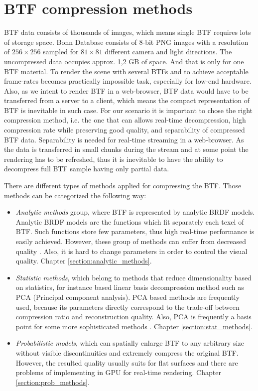 \chapter{BTF compression methods}
\label{chapter:compression_methods}



 BTF data consists of thousands of images, which means single BTF requires lots of storage space.
Bonn  Database \cite{btfBonn} consists of 8-bit PNG images with a resolution of $256\times256$ sampled for $81\times81$ different camera and light directions.
 The uncompressed data occupies approx. 1,2 GB of space. And that is only for one BTF material.
 To render the scene with several BTFs and to achieve acceptable frame-rates becomes practically impossible task, especially for low-end hardware.
 Also, as we intent to render BTF in a web-browser, BTF data would have to be transferred from a server to a client, which means the compact representation of BTF is inevitable in such case.
 For our scenario it is important to chose the right compression method, i.e. the one that can allows real-time decompression, high compression rate while preserving good quality, and separability of compressed BTF data.
 Separability is needed for real-time streaming in a web-browser.  
 As the data is transferred in small chunks during the stream and at some point the rendering has to be refreshed, thus it is inevitable to have the ability to decompress full BTF sample having only partial data.

There are different types of methods applied for compressing the BTF. Those methods can be categorized the following way:

\begin{itemize}
  \item \emph{Analytic methods} group, where BTF is represented by analytic BRDF models. 
Analytic BRDF models are the functions which fit separately each texel of BTF. Such functions store few parameters, thus high real-time performance is easily achieved.
However, these group of methods can suffer from decreased quality \cite{haindl}. Also, it is hard to change parameters in order to control the visual quality. Chapter  \ref{section:analytic_methods}.
   \item \emph{Statistic methods}, which belong to methods that reduce dimensionality based on  statistics, for instance based linear basis decompression method such as PCA (Principal component analysis). 
    PCA based methods are frequently used, because its parameters directly correspond to the trade-off between compression ratio and reconstruction quality.
    Also, PCA is frequently a basis point for some more sophisticated methods \cite{webglbtfstreaming}. Chapter \ref{section:stat_methods}.
   \item \emph{Probabilistic models}, which can spatially enlarge BTF to any arbitrary size without visible discontinuities and extremely compress the original BTF.
   However, the resulted quality usually suits for flat surfaces and there are problems of implementing in GPU for real-time rendering. Chapter \ref{section:prob_methods}.
 \end{itemize}



